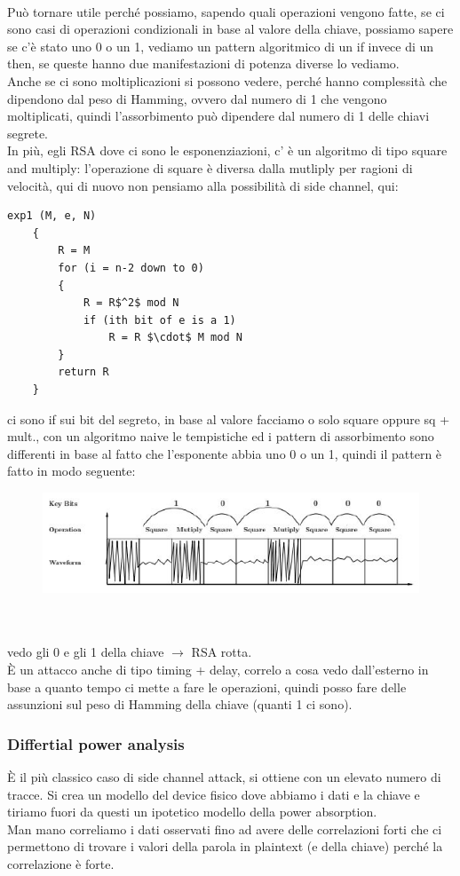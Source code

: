 \documentclass[oneside, 12pt]{extbook}
\begin{document}
\\Può tornare utile perché possiamo, sapendo quali operazioni vengono fatte, se ci sono casi di operazioni condizionali in base al valore della chiave, possiamo sapere se c'è stato uno 0 o un 1, vediamo un pattern algoritmico di un if invece di un then, se queste hanno due manifestazioni di potenza diverse lo vediamo.
\\Anche se ci sono moltiplicazioni si possono vedere, perché hanno complessità che dipendono dal peso di Hamming, ovvero dal numero di 1 che vengono moltiplicati, quindi l'assorbimento può dipendere dal numero di 1 delle chiavi segrete.
\\In più, egli RSA dove ci sono le esponenziazioni, c' è un algoritmo di tipo square and multiply: l'operazione di square è diversa dalla mutliply per ragioni di velocità, qui di nuovo non pensiamo alla possibilità di side channel, qui:
\begin{lstlisting}[mathescape=true]
	exp1 (M, e, N)
	{
		R = M
		for (i = n-2 down to 0)
		{
			R = R$^2$ mod N
			if (ith bit of e is a 1)
				R = R $\cdot$ M mod N
		}
		return R
	}
\end{lstlisting}
ci sono if sui bit del segreto, in base al valore facciamo o solo square oppure sq + mult., con un algoritmo naive le tempistiche ed i pattern di assorbimento sono differenti in base al fatto che l'esponente abbia uno 0 o un 1, quindi il pattern è fatto in modo seguente:\\
\begin{figure}[!h]
	\includegraphics[scale=0.4]{immagini/hardware/pattern.png}
\end{figure}
\\\\vedo gli 0 e gli 1 della chiave $\rightarrow$ RSA rotta.
\\È un attacco anche di tipo timing + delay, correlo a cosa vedo dall'esterno in base a quanto tempo ci mette a fare le operazioni, quindi posso fare delle assunzioni sul peso di Hamming della chiave (quanti 1 ci sono).

\subsubsection{Differtial power analysis}
È il più classico caso di side channel attack, si ottiene con un elevato numero di tracce. Si crea un modello del device fisico dove abbiamo i dati e la chiave e tiriamo fuori da questi un ipotetico modello della power absorption.
\\Man mano correliamo i dati osservati fino ad avere delle correlazioni forti che ci permettono di trovare i valori della parola in plaintext (e della chiave) perché la correlazione è forte.
\end{document}
